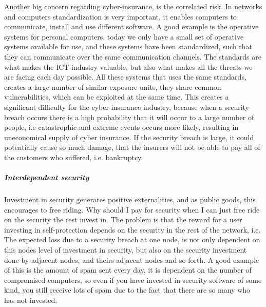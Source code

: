 Another big concern regarding cyber-insurance, is the correlated risk. In networks and computers
 standardization is very important, it enables computers to communicate, 
 install and use different software. A good example is the operative systems for personal computers,
  today we only have a small set of operative systems available for use, and these systems have been
   standardized, such that they can communicate over the same communication channels. The standards are what makes the ICT-industry valuable, 
   but also what makes all the threats we are facing each day possible. 
   All these systems that uses the same standards, creates a large number of similar exposure units,
    they share common vulnerabilities, which can be exploited at the same time. 
This creates a significant difficulty for the cyber-insurance industry, because
when a security breach occurs there is a high probability that it will occur to a large number of people, i.e catastrophic and extreme events occurs more likely, resulting in uneconomical supply of cyber insurance.
If the security breach is large, it could potentially cause so much damage, that the insurers will not be able to pay all of the customers who suffered, i.e. bankruptcy.\cite{bohme2010modeling} 
\subparagraph{Interdependent security}
Investment in security generates positive externalities, and as public goods, this encourages to free riding. Why should I pay for security when I can just free ride on the security the rest invest in.  The problem is that the reward for a user investing in self-protection depends on the security in the rest of the network, i.e. The expected loss due to a security breach at one node, is not only
dependent on this nodes level of investment in security, but also on the security investment done
  by adjacent nodes, and theirs adjacent nodes and so forth. 
  A good example of this is the amount of spam sent every day, it is dependent on the number of compromised computers, so even if you have invested in security software of some kind, you still receive lots of spam due to the fact that there are so many who has not invested. 
  \cite{towardsInsurable}

